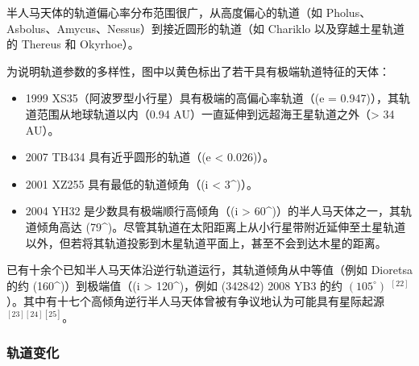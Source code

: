 半人马天体的轨道偏心率分布范围很广，从高度偏心的轨道（如 Pholus、Asbolus、Amycus、Nessus）到接近圆形的轨道（如 Chariklo 以及穿越土星轨道的 Thereus 和 Okyrhoe）。

为说明轨道参数的多样性，图中以黄色标出了若干具有极端轨道特征的天体：
\begin{itemize}
\item 1999 XS35（阿波罗型小行星）具有极端的高偏心率轨道（(e = 0.947)），其轨道范围从地球轨道以内（0.94 AU）一直延伸到远超海王星轨道之外（> 34 AU）。
\item 2007 TB434 具有近乎圆形的轨道（(e < 0.026)）。
\item 2001 XZ255 具有最低的轨道倾角（(i < 3^\circ)）。
\item 2004 YH32 是少数具有极端顺行高倾角（(i > 60^\circ)）的半人马天体之一，其轨道倾角高达 (79^\circ)。尽管其轨道在太阳距离上从小行星带附近延伸至土星轨道以外，但若将其轨道投影到木星轨道平面上，甚至不会到达木星的距离。
\end{itemize}
已有十余个已知半人马天体沿逆行轨道运行，其轨道倾角从中等值（例如 Dioretsa 的约 (160^\circ)）到极端值（(i > 120^\circ)，例如 (342842) 2008 YB3 的约 $(105^\circ)$ $^{[22]}$）。其中有十七个高倾角逆行半人马天体曾被有争议地认为可能具有星际起源 $^{[23][24][25]}$。
\subsubsection{轨道变化}

